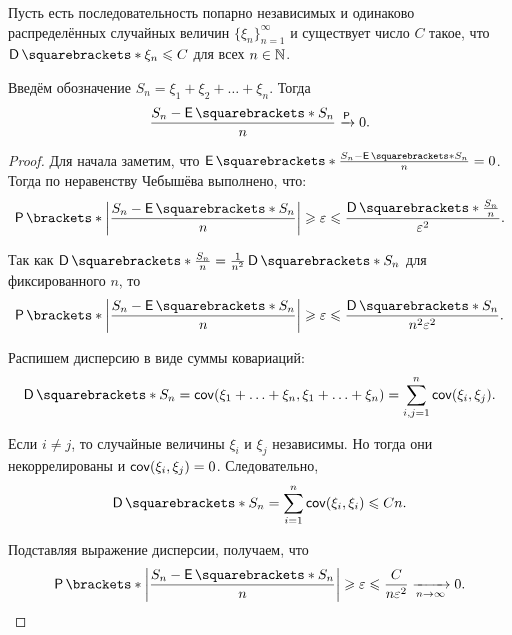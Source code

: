 \begin{theorem}
    Пусть есть последовательность попарно независимых и одинаково распределённых случайных величин \(\{\xi_n\}_{n = 1}^{\infty}\) и существует число \(C\) такое, что \(\D{\xi_n} \leq C\) для всех \(n \in \mathbb{N}\).
    
    Введём обозначение \(S_n = \xi_1 + \xi_2 + \dots + \xi_n\). Тогда
    \[\frac{S_n - \E{S_n}}{n} \prto 0.\]    
\end{theorem}
\begin{proof}
    Для начала заметим, что \(\E{\frac{S_n - \E{S_n}}{n}} = 0\). Тогда по неравенству Чебышёва выполнено, что:
    \[\Pr{\left|\frac{S_n - \E{S_n}}{n}\right| \geq \epsilon} \leq \frac{\D{\frac{S_n}{n}}}{\epsilon^2}.\] 
    
    Так как \(\D{\frac{S_n}{n}} = \frac{1}{n^2}\D{S_n}\) для фиксированного \(n\), то 
    \[\Pr{\left|\frac{S_n - \E{S_n}}{n}\right| \geq \epsilon} \leq \frac{\D{S_n}}{n^2\epsilon^2}.\]
    
    Распишем дисперсию в виде суммы ковариаций:
    \[\D{S_n} = \cov(\xi_1 + \ldots + \xi_n, \xi_1 + \ldots + \xi_n) = \sum\limits_{i, j = 1}^{n} \cov(\xi_i, \xi_j).\]
    
    Если \(i \neq j\), то случайные величины \(\xi_i\) и \(\xi_j\) независимы. Но тогда они некоррелированы и \(\operatorname{\mathsf{cov}}(\xi_i, \xi_j) = 0\). Следовательно,
    \[\D{S_n} = \sum\limits_{i = 1}^{n} \cov(\xi_i, \xi_i) \leq Cn.\]
    
    Подставляя выражение дисперсии, получаем, что
    \[\Pr{\left|\frac{S_n - \E{S_n}}{n}\right| \geq \epsilon} \leq \frac{C}{n\epsilon^2}\xrightarrow[n \to \infty]{} 0.\qedhere\]
    
	
	
\end{proof}

